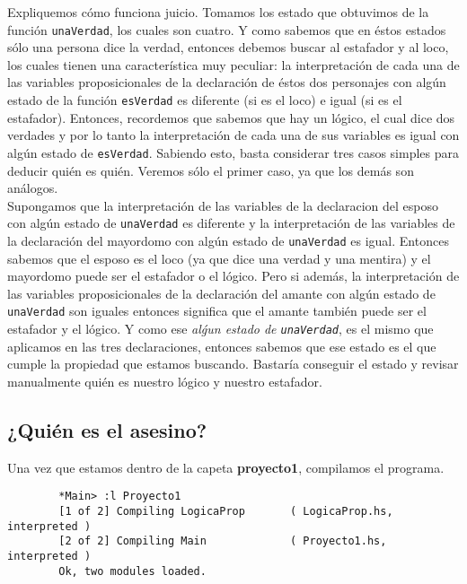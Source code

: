 \documentclass[letterpaper,11pt]{article}
\begin{document}
\begin{itemize}
        Expliquemos cómo funciona juicio. Tomamos los estado que obtuvimos de 
        la función \texttt{unaVerdad}, los cuales son cuatro. Y como sabemos 
        que en éstos estados sólo una persona dice la verdad, entonces debemos
        buscar al estafador y al loco, los cuales tienen una característica muy
        peculiar: la interpretación de cada una de las variables 
        proposicionales de la declaración de éstos dos personajes con algún 
        estado de la función \texttt{esVerdad} es diferente (si es el loco) e 
        igual (si es el estafador). Entonces, recordemos que sabemos que hay 
        un lógico, el cual dice dos verdades y por lo tanto la interpretación 
        de cada una de sus variables es igual con algún estado de 
        \texttt{esVerdad}. Sabiendo esto, basta considerar tres casos simples
        para deducir quién es quién. Veremos sólo el primer caso, ya que los
        demás son análogos. \\
        Supongamos que la interpretación de las variables de la declaracion del
        esposo con algún estado de \texttt{unaVerdad} es diferente y la 
        interpretación de las variables de la declaración del mayordomo con 
        algún estado de \texttt{unaVerdad} es igual. Entonces sabemos que el 
        esposo es el loco (ya que dice una verdad y una mentira) y el mayordomo 
        puede ser el estafador o el lógico. Pero si además, la interpretación de
        las variables proposicionales de la declaración del amante con algún 
        estado de \texttt{unaVerdad} son iguales entonces significa que el 
        amante también puede ser el estafador y el lógico. Y como ese 
        \textit{alǵun estado de \texttt{unaVerdad}}, es el mismo que aplicamos
        en las tres declaraciones, entonces sabemos que ese estado es el que 
        cumple la propiedad que estamos buscando. Bastaría conseguir el estado 
        y revisar manualmente quién es nuestro lógico y nuestro estafador. 
    \end{itemize}

    \subsection{¿Quién es el asesino?}
    Una vez que estamos dentro de la capeta \textbf{proyecto1}, compilamos el 
    programa. 
    \begin{lstlisting}
        *Main> :l Proyecto1
        [1 of 2] Compiling LogicaProp       ( LogicaProp.hs, interpreted )
        [2 of 2] Compiling Main             ( Proyecto1.hs, interpreted )
        Ok, two modules loaded.
    \end{lstlisting}
\end{document}
